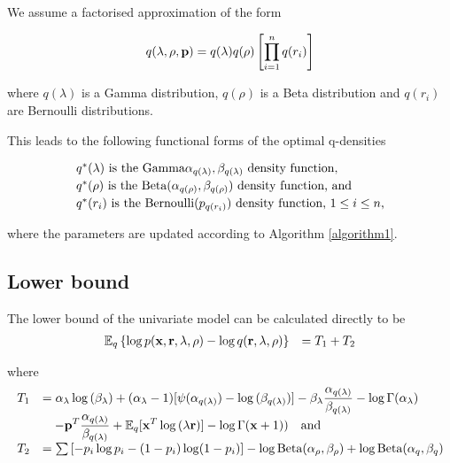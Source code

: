 \documentclass{article}[12pt]
\begin{document}
\noindent We assume a factorised approximation of the form

$$
q(\lambda, \rho, {\bf p}) = q(\lambda) q(\rho) \left [ \prod_{i=1}^n q(r_i) \right ]
$$

\noindent where $q(\lambda)$ is a Gamma distribution, $q(\rho)$ is a Beta distribution 
and $q(r_i)$ are Bernoulli distributions.

\noindent This leads to the following functional forms of the optimal q-densities

$$
\begin{array}{l}
\mbox{$q^*(\lambda)$ is the $\text{Gamma} \alpha_{q(\lambda)}, \beta_{q(\lambda)}$ density function,} \\ [0.5ex]
\mbox{$q^*(\rho)$ is the $\text{Beta}(\alpha_{q(\rho)}, \beta_{q(\rho)})$ density function, and} \\ [0.5ex]
\mbox{$q^*(r_i)$  is the $\text{Bernoulli}(p_{q(r_i)})$ density function, $1 \leq i \leq n$,}
\end{array}
$$


\noindent where the parameters are updated according to Algorithm \ref{algorithm1}. 

\subsection{Lower bound}
The lower bound of the univariate model can be calculated directly to be
$$
\begin{array}{rl}
{\mathbb E}_q \left\{ \log{p({\bf x}, {\bf r}, \lambda, \rho)} - \log{q({\bf r}, \lambda, \rho)} \right\} &= T_1 + T_2 \\
\end{array}
$$

\noindent where
$$
\begin{array}{rl}
T_1 & \displaystyle =
\alpha_\lambda \log{(\beta_\lambda)} + (\alpha_\lambda - 1) [\psi(\alpha_{q(\lambda)}) - \log{(\beta_{q(\lambda)})}] - \beta_\lambda \frac{\alpha_{q(\lambda)}}{\beta_{q(\lambda)}} - \log\Gamma(\alpha_\lambda) \\
& \displaystyle \quad -{\bf p}^T\frac{\alpha_{q(\lambda)}}{\beta_{q(\lambda)}} + {\mathbb E}_q[{\bf x}^T \log{(\lambda {\bf r})}] - \log\Gamma({\bf x}+1)) \quad \mbox{and} 
\\ [1ex]
T_2 &= \sum \left [ - p_i \log p_i - (1 - p_i) \log (1 - p_i) \right ] - \log \text{Beta} (\alpha_\rho, \beta_\rho) + \log \text{Beta} (\alpha_q, \beta_q)
\end{array}
$$
\end{document}
